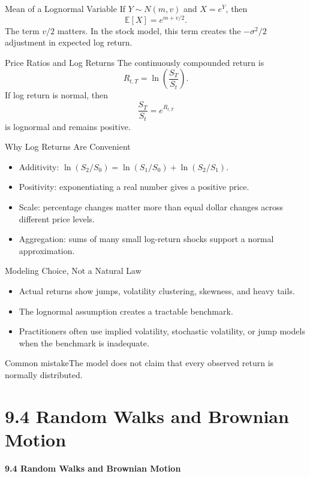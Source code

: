 \documentclass[aspectratio=169]{beamer}
\newcommand{\E}{\mathbb{E}}
\begin{document}
\begin{frame}[t]{Mean of a Lognormal Variable}
\justifying
If $Y\sim N(m,v)$ and $X=e^Y$, then
\[\E[X]=e^{m+v/2}.\]
The term $v/2$ matters. In the stock model, this term creates the $-\sigma^2/2$ adjustment in expected log return.
\end{frame}

\begin{frame}[t]{Price Ratios and Log Returns}
\justifying
The continuously compounded return is
\[R_{t,T}=\ln\left(\frac{S_T}{S_t}\right).\]
If log return is normal, then
\[\frac{S_T}{S_t}=e^{R_{t,T}}\]
is lognormal and remains positive.
\end{frame}

\begin{frame}[t]{Why Log Returns Are Convenient}
\justifying
\begin{itemize}
\item Additivity: $\ln(S_2/S_0)=\ln(S_1/S_0)+\ln(S_2/S_1)$.
\item Positivity: exponentiating a real number gives a positive price.
\item Scale: percentage changes matter more than equal dollar changes across different price levels.
\item Aggregation: sums of many small log-return shocks support a normal approximation.
\end{itemize}
\end{frame}

\begin{frame}[t]{Modeling Choice, Not a Natural Law}
\justifying
\begin{itemize}
\item Actual returns show jumps, volatility clustering, skewness, and heavy tails.
\item The lognormal assumption creates a tractable benchmark.
\item Practitioners often use implied volatility, stochastic volatility, or jump models when the benchmark is inadequate.
\end{itemize}\begin{alertblock}{Common mistake}The model does not claim that every observed return is normally distributed.\end{alertblock}
\end{frame}

\section{9.4 Random Walks and Brownian Motion}
\begin{frame}[plain]
\centering\vfill
{\color{TitleBlue}\Large\bfseries 9.4 Random Walks and Brownian Motion}\par
\vspace{0.5cm}{\large From many small shocks to a continuous random path}\par
\vfill\end{frame}
\end{document}
